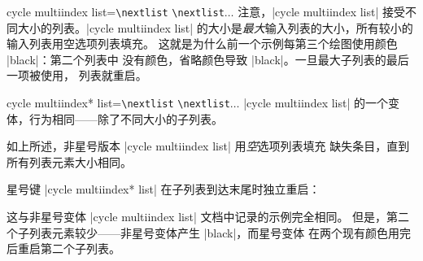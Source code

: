\begin{pgfplotskey}{%
    cycle multiindex list=\texttt{\textbackslash nextlist}%
    \texttt{\textbackslash nextlist}$\ldots$
}
    注意，|cycle multiindex list| 接受不同大小的列表。|cycle multiindex list|
    的大小是\emph{最大}输入列表的大小，所有较小的输入列表用空选项列表填充。
    这就是为什么前一个示例每第三个绘图使用颜色 |black|：第二个列表中
    没有颜色，省略颜色导致 |black|。一旦最大子列表的最后一项被使用，
    列表就重启。
\end{pgfplotskey}

\begin{pgfplotskey}{%
    cycle multiindex* list=\texttt{\textbackslash nextlist}%
    \texttt{\textbackslash nextlist}$\ldots$
}
    |cycle multiindex list| 的一个变体，行为相同——除了不同大小的子列表。

    如上所述，非星号版本 |cycle multiindex list| 用\emph{空}选项列表填充
    缺失条目，直到所有列表元素大小相同。

    星号键 |cycle multiindex* list| 在子列表到达末尾时独立重启：
\begin{codeexample}[]
\end{codeexample}
    这与非星号变体 |cycle multiindex list| 文档中记录的示例完全相同。
    但是，第二个子列表元素较少——非星号变体产生 |black|，而星号变体
    在两个现有颜色用完后重启第二个子列表。


\end{pgfplotskey}

